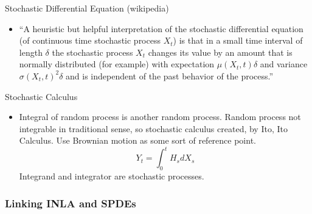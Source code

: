 \documentclass{article}
\begin{document}
Stochastic Differential Equation (wikipedia)
\begin{itemize}
\item ``A heuristic but helpful interpretation of the stochastic differential equation (of continuous time stochastic process $X_{t}$) is that in a small time interval of length $\delta$ the stochastic process $X_{t}$ changes its value by an amount that is normally distributed (for example) with expectation $\mu(X_{t},t)\delta$ and variance $\sigma(X_{t}, t)^{2}\delta$ and is independent of the past behavior of the process.''
\end{itemize}
Stochastic Calculus \citep{Mao2007}
\begin{itemize}
\item Integral of random process is another random process. Random process not integrable in traditional sense, so stochastic calculus created, by Ito, Ito Calculus. Use Brownian motion as some sort of reference point.
$$ Y_{t} = \int_{0}^{t} H_{s} dX_{s} $$
Integrand and integrator are stochastic processes.
\end{itemize}

\subsubsection{Linking INLA and SPDEs}
\end{document}
